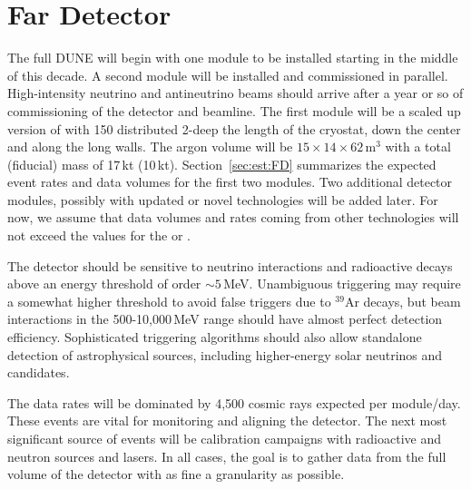 \documentclass[../main-v1.tex]{subfiles}
\begin{document}
\section{Far Detector %
}
\label{sec:intro-fd}

The full DUNE  will begin with one  module to be installed %
starting in the middle of  this decade.  A second  module will be installed and commissioned in parallel.  High-intensity neutrino and antineutrino beams should arrive after a year or so of commissioning of the detector and  beamline.  The first %
module will %
be a scaled up version of  with 150  distributed 2-deep %
the length of the cryostat, down the center and along the long walls. %
The argon volume will be $15\times14\times62$\,m$^3$ with a total (fiducial) mass of 17\,kt (10\,kt).  Section~\ref{sec:est:FD} summarizes the expected event rates and data volumes for the first two modules.  Two additional detector modules, possibly with updated or novel technologies %
will be added later. For now, we assume that data volumes and rates coming from other technologies will not exceed %
the values for the  or .



The detector should be sensitive to neutrino interactions and radioactive decays above an energy threshold of order $\sim 5$\,MeV.  Unambiguous triggering may require a somewhat higher threshold  to avoid false triggers due to $^{39}$Ar decays,  but beam interactions in the 500-10,000\,MeV range should have almost perfect detection efficiency. Sophisticated triggering algorithms should also allow standalone detection of astrophysical sources, including higher-energy solar neutrinos and  candidates. 

The data rates will be dominated by 4,500 cosmic rays expected per module/day.  These events are vital for monitoring and aligning the detector. %
The next most significant source of events will be calibration campaigns with radioactive and neutron sources and lasers.  In all cases, the goal is to gather data from the full volume of the detector with as fine a granularity as possible. 
\end{document}

